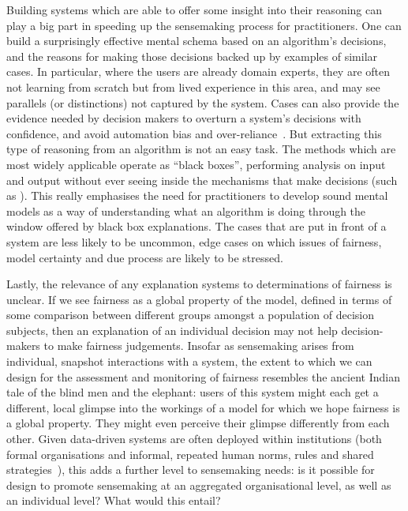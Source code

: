 \documentclass[sigchi-a, authorversion]{acmart}
\begin{document}
Building systems which are able to offer some insight into their reasoning can play a big part in speeding up the sensemaking process for practitioners. One can build a surprisingly effective mental schema based on an algorithm's decisions, and the reasons for making those decisions backed up by examples of similar cases. In particular, where the users are already domain experts, they are often not learning from scratch but from lived experience in this area, and may see parallels (or distinctions) not captured by the system. Cases can also provide the evidence needed by decision makers to overturn a system's decisions with confidence, and avoid automation bias and over-reliance~\cite{Skitka:1999il}. But extracting this type of reasoning from an algorithm is not an easy task. The methods which are most widely applicable operate as ``black boxes'', performing analysis on input and output without ever seeing inside the mechanisms that make decisions (such as \cite{ribeiro2016should}). This really emphasises the need for practitioners to develop sound mental models as a way of understanding what an algorithm is doing through the window offered by black box explanations. The cases that are put in front of a system are less likely to be uncommon, edge cases on which issues of fairness, model certainty and due process are likely to be stressed. 

Lastly, the relevance of any explanation systems to determinations of fairness is unclear. If we see fairness as a global property of the model, defined in terms of some comparison between different groups amongst a population of decision subjects, then an explanation of an individual decision may not help decision-makers to make fairness judgements. Insofar as sensemaking arises from individual, snapshot interactions with a system, the extent to which we can design for the assessment and monitoring of fairness resembles the ancient Indian tale of the blind men and the elephant: users of this system might each get a different, local glimpse into the workings of a model for which we hope fairness is a global property. They might even perceive their glimpse differently from each other. Given data-driven systems are often deployed within institutions (both formal organisations and informal, repeated human norms, rules and shared strategies~\cite{crawford1995grammar}), this adds a further level to sensemaking needs: is it possible for design to promote sensemaking at an aggregated organisational level, as well as an individual level? What would this entail?
\end{document}
